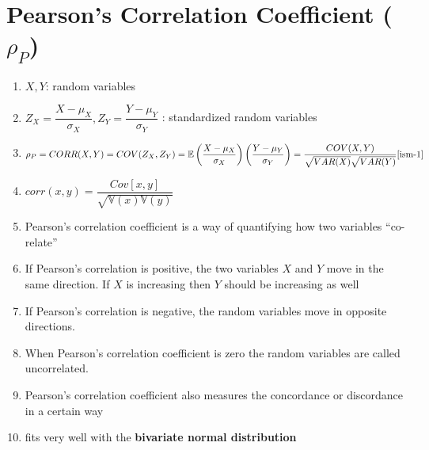 \section{Pearson’s Correlation Coefficient ($\rho_P$) \cite{ism-1,mfml-1}} \label{Multivariate Distributions: Pearson’s Correlation Coefficient}

\begin{enumerate}
    \item[] $X,Y$: random variables
    
    \vspace{0.1cm}
    \item[] $
        Z_X = \dfrac{X - \mu_X}{\sigma_X},
        Z_Y = \dfrac{Y - \mu_Y}{\sigma_Y}
    $ : standardized random variables

    \vspace{0.2cm}
    
    \item[] 
    \[
        \rho_P 
        = CORR(X,Y)
        = COV(Z_X, Z_Y)
        = \mathbb{E}\left( \dfrac{X - \mu_X}{\sigma_X} \right) \left( \dfrac{Y - \mu_Y}{\sigma_Y} \right)
        = \dfrac{COV(X,Y)}{\sqrt{VAR(X)} \sqrt{VAR(Y)}}
        \hfill \text{\cite{ism-1}}
    \]
    
    \item[] $
        corr(x,y)
        = \dfrac{Cov[x,y]}{\sqrt{\mathbb{V}(x) \mathbb{V}(y)}}
    $ \hfill \cite{mfml-1}
    
    \vspace{0.2cm}
    
    \item Pearson’s correlation coefficient is a way of quantifying how two variables “co-relate”

    \item If Pearson’s correlation is positive, the two variables $X$ and $Y$ move in the same direction. If $X$ is increasing then $Y$ should be increasing as well

    \item If Pearson’s correlation is negative, the random variables move in opposite directions.

    \item When Pearson’s correlation coefficient is zero the random variables are called uncorrelated.

    \item Pearson’s correlation coefficient also measures the concordance or discordance in a certain way

    \item fits very well with the \textbf{bivariate normal distribution}


\end{enumerate}

